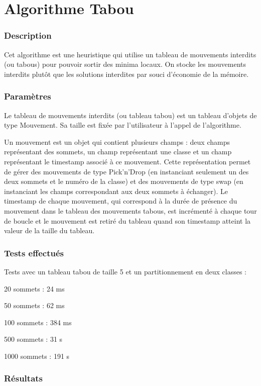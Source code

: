 \documentclass[12pt]{article}
\begin{document}
\newpage

\part{Algorithme Tabou}
\section{Description}
Cet algorithme est une heuristique qui utilise un tableau de mouvements interdits (ou tabous) pour pouvoir sortir des minima locaux. On stocke les mouvements interdits plutôt que les solutions interdites par souci d’économie de la mémoire.

\section{Paramètres}
Le tableau de mouvements interdits (ou tableau tabou) est un tableau d’objets de type Mouvement. Sa taille est fixée par l’utilisateur à l’appel de l’algorithme.

Un mouvement est un objet qui contient plusieurs champs : deux champs représentant des sommets, un champ représentant une classe et un champ représentant le timestamp associé à ce mouvement. Cette représentation permet de gérer des mouvements de type Pick’n’Drop (en instanciant seulement un des deux sommets et le numéro de la classe) et des mouvements de type swap (en instanciant les champs correspondant aux deux sommets à échanger).
Le timestamp de chaque mouvement, qui correspond à la durée de présence du mouvement dans le tableau des mouvements tabous, est incrémenté à chaque tour de boucle et le mouvement est retiré du tableau quand son timestamp atteint la valeur de la taille du tableau.

\section{Tests effectués}
Tests avec un tableau tabou de taille 5 et un partitionnement en deux classes :

20 sommets : 24 ms

50 sommets : 62 ms

100 sommets : 384 ms

500 sommets : 31 s

1000 sommets : 191 s

\section{Résultats}
\end{document}
